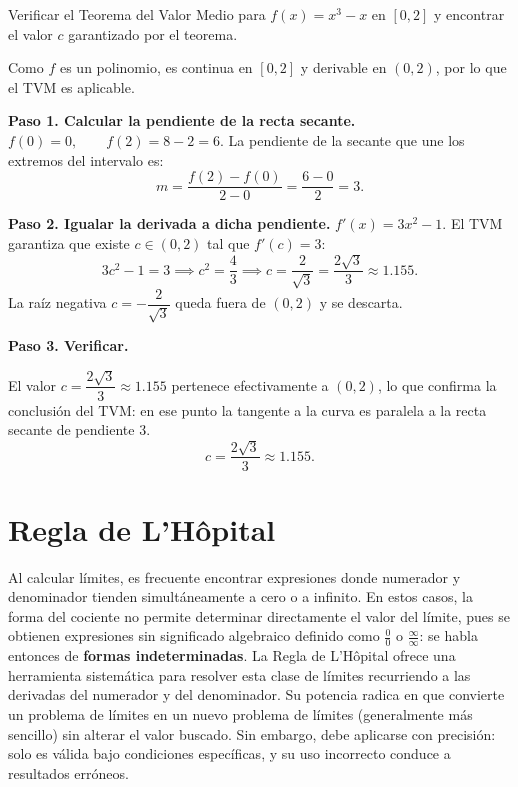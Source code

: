 \begin{example}[Verificación del TVM para $f(x)=x^3-x$]
Verificar el Teorema del Valor Medio para $f(x)=x^3-x$ en $[0,2]$
y encontrar el valor $c$ garantizado por el teorema.
\begin{myproof}
Como $f$ es un polinomio, es continua en $[0,2]$ y derivable en
$(0,2)$, por lo que el TVM es aplicable.

\textbf{Paso 1. Calcular la pendiente de la recta secante.} \(
f(0) = 0, \qquad f(2) = 8-2 = 6.
\)
La pendiente de la secante que une los extremos del intervalo es:
\[
m = \frac{f(2)-f(0)}{2-0} = \frac{6-0}{2} = 3.
\]

\textbf{Paso 2. Igualar la derivada a dicha pendiente.} \(
f'(x) = 3x^2 - 1.
\) El TVM garantiza que existe $c\in(0,2)$ tal que $f'(c)=3$:
\[
3c^2 - 1 = 3 \implies c^2 = \frac{4}{3} \implies c = \frac{2}{\sqrt{3}}
= \frac{2\sqrt{3}}{3} \approx 1.155.
\]
La raíz negativa $c=-\dfrac{2}{\sqrt{3}}$ queda fuera de $(0,2)$ y
se descarta.

\textbf{Paso 3. Verificar.}

El valor $c=\dfrac{2\sqrt{3}}{3}\approx 1.155$ pertenece efectivamente
a $(0,2)$, lo que confirma la conclusión del TVM: en ese punto la
tangente a la curva es paralela a la recta secante de pendiente $3$.
\[
\boxed{c = \frac{2\sqrt{3}}{3} \approx 1.155.}
\]
\end{myproof}
\end{example}

\section{Regla de L'Hôpital}

Al calcular límites, es frecuente encontrar expresiones donde numerador
y denominador tienden simultáneamente a cero o a infinito. En estos
casos, la forma del cociente no permite determinar directamente el valor
del límite, pues se obtienen expresiones sin significado algebraico
definido como $\frac{0}{0}$ o $\frac{\infty}{\infty}$: se habla
entonces de \textbf{formas indeterminadas}. La Regla de L'Hôpital
ofrece una herramienta sistemática para resolver esta clase de límites
recurriendo a las derivadas del numerador y del denominador. Su
potencia radica en que convierte un problema de límites en un nuevo
problema de límites (generalmente más sencillo)
 sin alterar el valor
buscado. Sin embargo, debe aplicarse con precisión: solo es válida
bajo condiciones específicas, y su uso incorrecto conduce a resultados
erróneos.

